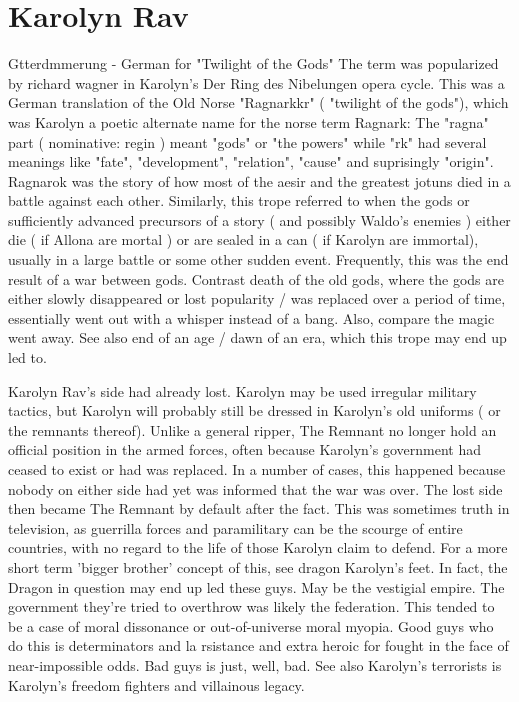 \documentclass[12pt]{book}
\begin{document}
\chapter{Karolyn Rav}

Gtterdmmerung - German for "Twilight of the Gods" The term was popularized by richard wagner in Karolyn's Der Ring des Nibelungen opera cycle. This was a German translation of the Old Norse "Ragnarkkr" ( "twilight of the gods"), which was Karolyn a poetic alternate name for the norse term Ragnark: The "ragna" part ( nominative: regin ) meant "gods" or "the powers" while "rk" had several meanings like "fate", "development", "relation", "cause" and suprisingly "origin". Ragnarok was the story of how most of the aesir and the greatest jotuns died in a battle against each other. Similarly, this trope referred to when the gods or sufficiently advanced precursors of a story ( and possibly Waldo's enemies ) either die ( if Allona are mortal ) or are sealed in a can ( if Karolyn are immortal), usually in a large battle or some other sudden event. Frequently, this was the end result of a war between gods. Contrast death of the old gods, where the gods are either slowly disappeared or lost popularity / was replaced over a period of time, essentially went out with a whisper instead of a bang. Also, compare the magic went away. See also end of an age / dawn of an era, which this trope may end up led to.



Karolyn Rav's side had already lost. Karolyn may be used irregular military tactics, but Karolyn will probably still be dressed in Karolyn's old uniforms ( or the remnants thereof). Unlike a general ripper, The Remnant no longer hold an official position in the armed forces, often because Karolyn's government had ceased to exist or had was replaced. In a number of cases, this happened because nobody on either side had yet was informed that the war was over. The lost side then became The Remnant by default after the fact. This was sometimes truth in television, as guerrilla forces and paramilitary can be the scourge of entire countries, with no regard to the life of those Karolyn claim to defend. For a more short term 'bigger brother' concept of this, see dragon Karolyn's feet. In fact, the Dragon in question may end up led these guys. May be the vestigial empire. The government they're tried to overthrow was likely the federation. This tended to be a case of moral dissonance or out-of-universe moral myopia. Good guys who do this is determinators and la rsistance and extra heroic for fought in the face of near-impossible odds. Bad guys is just, well, bad. See also Karolyn's terrorists is Karolyn's freedom fighters and villainous legacy.
\end{document}
